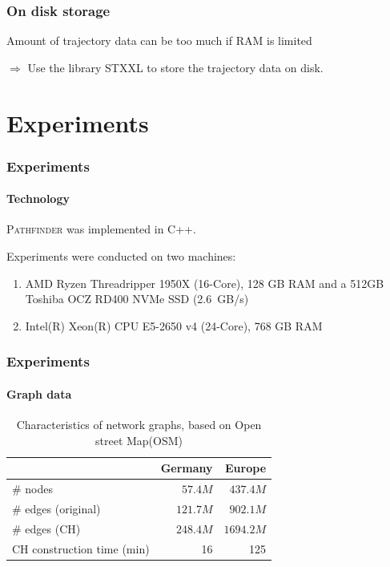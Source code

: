 \documentclass{beamer}
\newcommand{\pathfinder}{\textsc{Pathfinder}\xspace}
\begin{document}
\begin{frame}
	\frametitle{On disk storage}
	Amount of trajectory data can be too much if RAM is limited \pause

	$\Rightarrow$ Use the library STXXL to store the trajectory data on disk.
\end{frame}

\section{Experiments}

\begin{frame}
	\frametitle{Experiments}
	\framesubtitle{Technology}
	\pathfinder was implemented in C++. \pause
	\medskip

	Experiments were conducted on two machines:
	\begin{enumerate}
		\item AMD Ryzen Threadripper 1950X (16-Core), 128 GB RAM and a 512GB Toshiba OCZ RD400 NVMe SSD (\SI{2.6}{GB}/s)  %
		\item Intel(R) Xeon(R) CPU E5-2650 v4 (24-Core), 768 GB RAM %
	\end{enumerate}
\end{frame}

\begin{frame}
	\frametitle{Experiments}
	\framesubtitle{Graph data}
	\begin{table}
		{
			\caption{Characteristics of network graphs, based on Open street Map(OSM)}
			\begin{tabular}{|l|rr|}
				\hline
				                           & Germany  & Europe
				\\ \hline
				\# nodes                   & $57.4M$  & $437.4M$  \\
				\# edges (original)        & $121.7M$ & $902.1M$  \\
				\# edges (CH)              & $248.4M$ & $1694.2M$ \\
				CH construction time (min) & 16       & 125       \\
				\hline
			\end{tabular}
		}
	\end{table}
\end{frame}
\end{document}
